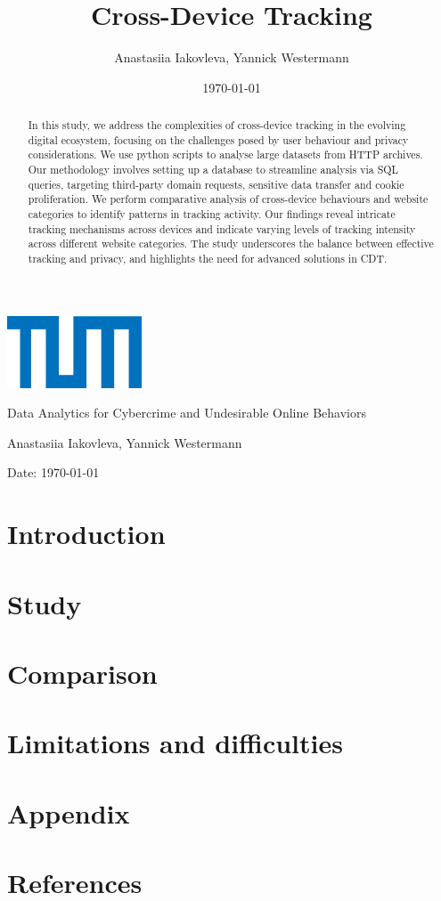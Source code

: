 \documentclass{article}
\title{Cross-Device Tracking}
\author{Anastasiia Iakovleva, Yannick Westermann}
\date{\today}
\renewcommand\maketitle{
  \begin{titlepage}
    \centering
    \includegraphics[width=0.3\textwidth]{./assets/tum-logo.png} 
    \vspace{1cm}

    \Large
    Data Analytics for Cybercrime and Undesirable Online Behaviors
    \vspace{2cm}

    \Huge
    \thetitle{}
    \vspace{2cm}

    \Large
    Anastasiia Iakovleva, Yannick Westermann
    \vspace{1cm}

    \normalsize
    Date: \today
    \vspace{1cm}

    \begin{abstract}
      In this study, we address the complexities of cross-device tracking in the evolving digital ecosystem, focusing on the challenges posed by user behaviour and privacy considerations. We use python scripts to analyse large datasets from HTTP archives. Our methodology involves setting up a database to streamline analysis via SQL queries, targeting third-party domain requests, sensitive data transfer and cookie proliferation. We perform comparative analysis of cross-device behaviours and website categories to identify patterns in tracking activity. Our findings reveal intricate tracking mechanisms across devices and indicate varying levels of tracking intensity across different website categories. The study underscores the balance between effective tracking and privacy, and highlights the need for advanced solutions in CDT.
    \end{abstract}
  \end{titlepage}
}
\begin{document}
\maketitle

\newpage
\tableofcontents
\newpage

\section{Introduction}\label{sec:introduction}


\section{Study}\label{sec:methodology}


\section{Comparison}\label{sec:results}


\section{Limitations and difficulties}\label{sec:conclusion}


\section{Appendix}\label{sec:attachments}


\section{References}\label{sec:references}

\end{document}
